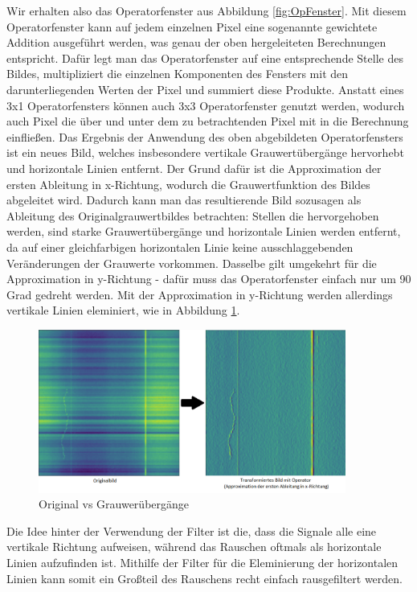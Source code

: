 \documentclass[12pt, a4paper]{article}
\begin{document}
Wir erhalten also das Operatorfenster aus Abbildung \ref{fig:OpFenster}. Mit diesem Operatorfenster kann auf jedem einzelnen Pixel eine sogenannte gewichtete Addition ausgeführt werden, was genau der oben hergeleiteten Berechnungen entspricht. Dafür legt man das Operatorfenster auf eine entsprechende Stelle des Bildes, multipliziert die einzelnen Komponenten des Fensters mit den darunterliegenden Werten der Pixel und summiert diese Produkte. Anstatt eines 3x1 Operatorfensters können auch 3x3 Operatorfenster genutzt werden, wodurch auch Pixel die über und unter dem zu betrachtenden Pixel mit in die Berechnung einfließen. Das Ergebnis der Anwendung des oben abgebildeten Operatorfensters ist ein neues Bild, welches insbesondere vertikale Grauwertübergänge hervorhebt und horizontale Linien entfernt. Der Grund dafür ist die Approximation der ersten Ableitung in x-Richtung, wodurch die Grauwertfunktion des Bildes abgeleitet wird. Dadurch kann man das resultierende Bild sozusagen als Ableitung des Originalgrauwertbildes betrachten: Stellen die hervorgehoben werden, sind starke Grauwertübergänge und horizontale Linien werden entfernt, da auf einer gleichfarbigen horizontalen Linie keine ausschlaggebenden Veränderungen der Grauwerte vorkommen. Dasselbe gilt umgekehrt für die Approximation in y-Richtung - dafür muss das Operatorfenster einfach nur um 90 Grad gedreht werden. Mit der Approximation in y-Richtung werden allerdings vertikale Linien eleminiert, wie in Abbildung \ref{fig:ableitung}.

\begin{figure}[t]
\centering
\includegraphics[width=0.9\textwidth]{img/original-vs-cv.png}
\caption{Original vs Grauwerübergänge}
\label{fig:ableitung}
\end{figure}

Die Idee hinter der Verwendung der Filter ist die, dass die Signale alle eine vertikale Richtung aufweisen, während das Rauschen oftmals als horizontale Linien aufzufinden ist. Mithilfe der Filter für die Eleminierung der horizontalen Linien kann somit ein Großteil des Rauschens recht einfach rausgefiltert werden.
\end{document}

